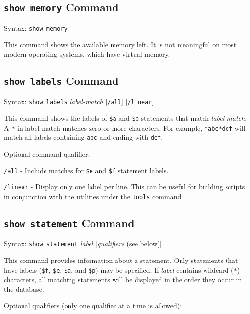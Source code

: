 \subsection{\texttt{show memory} Command}
Syntax:  \texttt{show memory}

This command shows the available memory left.  It is not meaningful
on most modern operating systems,
which have virtual memory.


\subsection{\texttt{show labels} Command}
Syntax:  \texttt{show labels} {\em label-match} [\texttt{/all}]
   [\texttt{/linear}]

This command shows the labels of \texttt{\$a} and \texttt{\$p}
statements that match {\em label-match}.  A \verb$*$ in {label-match}
matches zero or more characters.  For example, \verb$*abc*def$ will match all
labels containing \verb$abc$ and ending with \verb$def$.

Optional command qualifier:

   \texttt{/all} - Include matches for \texttt{\$e} and \texttt{\$f}
   statement labels.

   \texttt{/linear} - Display only one label per line.  This can be useful for
       building scripts in conjunction with the utilities under the
       \texttt{tools} command.



\subsection{\texttt{show statement} Command}
Syntax:  \texttt{show statement} {\em label} [{\em qualifiers} (see below)]

This command provides information about a statement.  Only statements
that have labels (\texttt{\$f},
\texttt{\$e},
\texttt{\$a}, and
\texttt{\$p}) may be specified.
If {\em label}
contains wildcard (\verb$*$) characters, all matching statements will be
displayed in the order they occur in the database.

Optional qualifiers (only one qualifier at a time is allowed):

